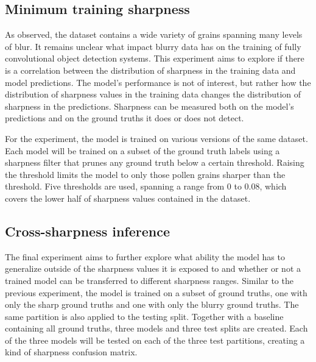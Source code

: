 \subsection{Minimum training sharpness}
As observed, the dataset contains a wide variety of grains spanning many levels of blur.
It remains unclear what impact blurry data has on the training of fully convolutional object detection systems.
This experiment aims to explore if there is a correlation between the distribution of sharpness in the training data and model predictions.
The model's performance is not of interest, but rather how the distribution of sharpness values in the training data changes the distribution of sharpness in the predictions.
Sharpness can be measured both on the model's predictions and on the ground truths it does or does not detect.

For the experiment, the model is trained on various versions of the same dataset.
Each model will be trained on a subset of the ground truth labels using a sharpness filter that prunes any ground truth below a certain threshold.
Raising the threshold limits the model to only those pollen grains sharper than the threshold.
Five thresholds are used, spanning a range from 0 to 0.08, which covers the lower half of sharpness values contained in the dataset.

\subsection{Cross-sharpness inference}
The final experiment aims to further explore what ability the model has to generalize outside of the sharpness values it is exposed to and whether or not a trained model can be transferred to different sharpness ranges.
Similar to the previous experiment, the model is trained on a subset of ground truths, one with only the sharp ground truths and one with only the blurry ground truths.
The same partition is also applied to the testing split.
Together with a baseline containing all ground truths, three models and three test splits are created.
Each of the three models will be tested on each of the three test partitions, creating a kind of sharpness confusion matrix.
